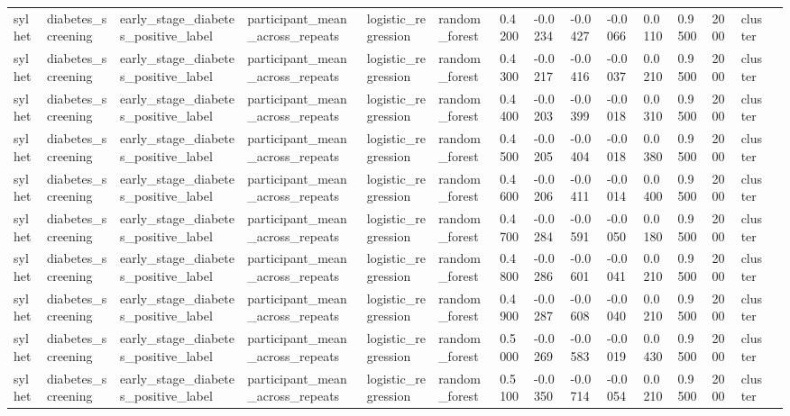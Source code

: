 \begin{tabular}{lllllllllllllll}
sylhet & diabetes\_screening & early\_stage\_diabetes\_positive\_label & participant\_mean\_across\_repeats & logistic\_regression & random\_forest & 0.4200 & -0.0234 & -0.0427 & -0.0066 & 0.0110 & 0.9500 & 2000 & cluster &  \\
sylhet & diabetes\_screening & early\_stage\_diabetes\_positive\_label & participant\_mean\_across\_repeats & logistic\_regression & random\_forest & 0.4300 & -0.0217 & -0.0416 & -0.0037 & 0.0210 & 0.9500 & 2000 & cluster &  \\
sylhet & diabetes\_screening & early\_stage\_diabetes\_positive\_label & participant\_mean\_across\_repeats & logistic\_regression & random\_forest & 0.4400 & -0.0203 & -0.0399 & -0.0018 & 0.0310 & 0.9500 & 2000 & cluster &  \\
sylhet & diabetes\_screening & early\_stage\_diabetes\_positive\_label & participant\_mean\_across\_repeats & logistic\_regression & random\_forest & 0.4500 & -0.0205 & -0.0404 & -0.0018 & 0.0380 & 0.9500 & 2000 & cluster &  \\
sylhet & diabetes\_screening & early\_stage\_diabetes\_positive\_label & participant\_mean\_across\_repeats & logistic\_regression & random\_forest & 0.4600 & -0.0206 & -0.0411 & -0.0014 & 0.0400 & 0.9500 & 2000 & cluster &  \\
sylhet & diabetes\_screening & early\_stage\_diabetes\_positive\_label & participant\_mean\_across\_repeats & logistic\_regression & random\_forest & 0.4700 & -0.0284 & -0.0591 & -0.0050 & 0.0180 & 0.9500 & 2000 & cluster &  \\
sylhet & diabetes\_screening & early\_stage\_diabetes\_positive\_label & participant\_mean\_across\_repeats & logistic\_regression & random\_forest & 0.4800 & -0.0286 & -0.0601 & -0.0041 & 0.0210 & 0.9500 & 2000 & cluster &  \\
sylhet & diabetes\_screening & early\_stage\_diabetes\_positive\_label & participant\_mean\_across\_repeats & logistic\_regression & random\_forest & 0.4900 & -0.0287 & -0.0608 & -0.0040 & 0.0210 & 0.9500 & 2000 & cluster &  \\
sylhet & diabetes\_screening & early\_stage\_diabetes\_positive\_label & participant\_mean\_across\_repeats & logistic\_regression & random\_forest & 0.5000 & -0.0269 & -0.0583 & -0.0019 & 0.0430 & 0.9500 & 2000 & cluster &  \\
sylhet & diabetes\_screening & early\_stage\_diabetes\_positive\_label & participant\_mean\_across\_repeats & logistic\_regression & random\_forest & 0.5100 & -0.0350 & -0.0714 & -0.0054 & 0.0210 & 0.9500 & 2000 & cluster &  \\

\end{tabular}
